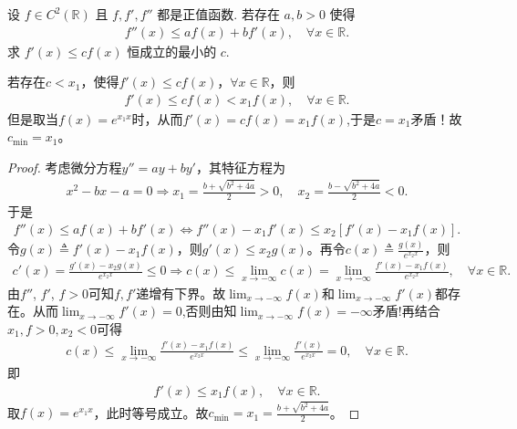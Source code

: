 \documentclass[../../main.tex]{subfiles}%
\begin{document}
\begin{example}
设 $f \in C^2(\mathbb{R})$ 且 $f, f', f''$ 都是正值函数. 若存在 $a, b > 0$ 使得
\begin{align*}
f''(x) \leqslant a f(x) + b f'(x), \quad \forall x \in \mathbb{R}.
\end{align*}
求 $f'(x) \leqslant c f(x)$ 恒成立的最小的 $c$.
\end{example}
\begin{remark}
若存在$c < x_1$，使得$f'(x) \leqslant c f(x)$，$\forall x \in \mathbb{R}$，则
\begin{align*}
f'(x) \leqslant c f(x) < x_1 f(x), \quad \forall x \in \mathbb{R}.
\end{align*}
但是取当$f(x) = e^{x_1 x}$时，从而$f'(x) =cf(x)= x_1 f(x)$,于是$c=x_1$矛盾！故$c_{\min} = x_1$。
\end{remark}
\begin{proof}

考虑微分方程$y'' = ay + by'$，其特征方程为
\begin{align*}
x^2 - bx - a = 0 \Rightarrow x_1 = \frac{b + \sqrt{b^2 + 4a}}{2} > 0, \quad x_2 = \frac{b - \sqrt{b^2 + 4a}}{2} < 0.
\end{align*}
于是
\begin{align*}
f''(x) \leqslant a f(x) + b f'(x) \Longleftrightarrow f''(x) - x_1 f'(x) \leqslant x_2 \left[ f'(x) - x_1 f(x) \right].
\end{align*}
令$g(x) \triangleq f'(x) - x_1 f(x)$，则$g'(x) \leqslant x_2 g(x)$。再令$c(x) \triangleq \frac{g(x)}{e^{x_2 x}}$，则
\begin{align*}
c'(x) = \frac{g'(x) - x_2 g(x)}{e^{x_2 x}} \leqslant 0 \Rightarrow c(x) \leqslant \lim_{x \rightarrow -\infty} c(x) = \lim_{x \rightarrow -\infty} \frac{f'(x) - x_1 f(x)}{e^{x_2 x}}, \quad \forall x \in \mathbb{R}.
\end{align*}
由$f''$, $f'$, $f > 0$可知$f, f'$递增有下界。故$\lim_{x \rightarrow -\infty} f(x)$和$\lim_{x \rightarrow -\infty} f'(x)$都存在。从而$\lim_{x \rightarrow -\infty} f'(x)=0$,否则由知$\lim_{x \rightarrow -\infty} f(x)=-\infty$矛盾!再结合$x_1,f>0,x_2<0$可得
\begin{align*}
c(x)\leqslant \lim_{x\rightarrow -\infty} \frac{f' (x)-x_1f(x)}{e^{x_2x}}\leqslant \lim_{x\rightarrow -\infty} \frac{f' (x)}{e^{x_2x}}=0,\quad \forall x\in \mathbb{R} .
\end{align*}
即
\begin{align*}
f'(x) \leqslant x_1 f(x), \quad \forall x \in \mathbb{R}.
\end{align*}
取$f(x) = e^{x_1 x}$，此时等号成立。故$c_{\min} = x_1 = \frac{b + \sqrt{b^2 + 4a}}{2}$。

\end{proof}
\end{document}
